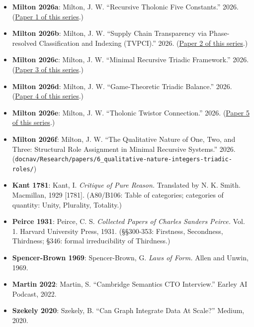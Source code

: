 \documentclass[
  11pt,
  letterpaper,
]{article}
\providecommand{\tightlist}{%
  \setlength{\itemsep}{0pt}\setlength{\parskip}{0pt}}
\begin{document}
\begin{itemize}
\tightlist
\item
  \textbf{Milton 2026a}: Milton, J. W. ``Recursive Tholonic Five
  Constants.'' 2026.
  (\href{https://github.com/baardev/truevalue/blob/main/docnav/Research/papers/1_recursive-tholonic-five-constants/1_recursive-tholonic-five-constants.pdf}{Paper
  1 of this series}.)
\item
  \textbf{Milton 2026b}: Milton, J. W. ``Supply Chain Transparency via
  Phase-resolved Classification and Indexing (TVPCI).'' 2026.
  (\href{https://github.com/baardev/truevalue/blob/main/docnav/Research/papers/2_supply-chain-transparency-tvpci/2_supply-chain-transparency-tvpci.pdf}{Paper
  2 of this series}.)
\item
  \textbf{Milton 2026c}: Milton, J. W. ``Minimal Recursive Triadic
  Framework.'' 2026.
  (\href{https://github.com/baardev/truevalue/blob/main/docnav/Research/papers/3_minimal-recursive-triadic-framework/3_minimal-recursive-triadic-framework.pdf}{Paper
  3 of this series}.)
\item
  \textbf{Milton 2026d}: Milton, J. W. ``Game-Theoretic Triadic
  Balance.'' 2026.
  (\href{https://github.com/baardev/truevalue/blob/main/docnav/Research/papers/4_game-theoretic-triadic-balance/4_game-theoretic-triadic-balance.pdf}{Paper
  4 of this series}.)
\item
  \textbf{Milton 2026e}: Milton, J. W. ``Tholonic Twistor Connection.''
  2026.
  (\href{https://github.com/baardev/truevalue/blob/main/docnav/Research/papers/5_tholonic-twistor-connection/5_tholonic-twistor-connection.pdf}{Paper
  5 of this series}.)
\item
  \textbf{Milton 2026f}: Milton, J. W. ``The Qualitative Nature of One,
  Two, and Three: Structural Role Assignment in Minimal Recursive
  Systems.'' 2026.
  (\texttt{docnav/Research/papers/6\_qualitative-nature-integers-triadic-roles/})
\item
  \textbf{Kant 1781}: Kant, I. \emph{Critique of Pure Reason.}
  Translated by N. K. Smith. Macmillan, 1929 {[}1781{]}. (A80/B106:
  Table of categories; categories of quantity: Unity, Plurality,
  Totality.)
\item
  \textbf{Peirce 1931}: Peirce, C. S. \emph{Collected Papers of Charles
  Sanders Peirce.} Vol. 1. Harvard University Press, 1931. (§§300-353:
  Firstness, Secondness, Thirdness; §346: formal irreducibility of
  Thirdness.)
\item
  \textbf{Spencer-Brown 1969}: Spencer-Brown, G. \emph{Laws of Form.}
  Allen and Unwin, 1969.
\item
  \textbf{Martin 2022}: Martin, S. ``Cambridge Semantics CTO
  Interview.'' Earley AI Podcast, 2022.
\item
  \textbf{Szekely 2020}: Szekely, B. ``Can Graph Integrate Data At
  Scale?'' Medium, 2020.
\end{itemize}
\end{document}
